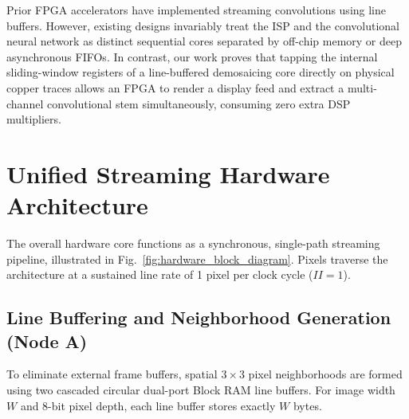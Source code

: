 \documentclass[conference]{IEEEtran}
\begin{document}
Prior FPGA accelerators have implemented streaming convolutions using line buffers. However, existing designs invariably treat the ISP and the convolutional neural network as distinct sequential cores separated by off-chip memory or deep asynchronous FIFOs. In contrast, our work proves that tapping the internal sliding-window registers of a line-buffered demosaicing core directly on physical copper traces allows an FPGA to render a display feed and extract a multi-channel convolutional stem simultaneously, consuming zero extra DSP multipliers.

\section{Unified Streaming Hardware Architecture}
\label{sec:hardware_arch}

The overall hardware core functions as a synchronous, single-path streaming pipeline, illustrated in Fig.~\ref{fig:hardware_block_diagram}. Pixels traverse the architecture at a sustained line rate of 1 pixel per clock cycle ($II=1$).

\subsection{Line Buffering and Neighborhood Generation (Node A)}
To eliminate external frame buffers, spatial $3\times3$ pixel neighborhoods are formed using two cascaded circular dual-port Block RAM line buffers. For image width $W$ and 8-bit pixel depth, each line buffer stores exactly $W$ bytes.
\end{document}
